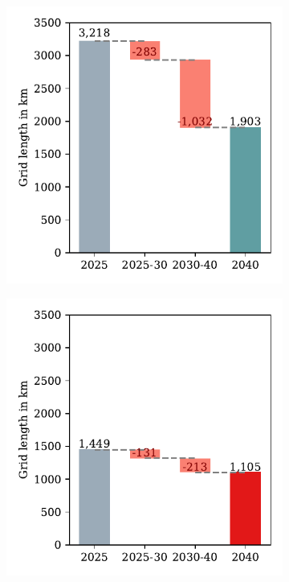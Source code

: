 \begin{figure}[h]
\begin{subfigure}[c]{0.5\textwidth}
		\includegraphics[width=1\linewidth]{figures/results/waterfall/waterfall_elec_mid.pdf}
		\vspace{-0.6cm}
		\label{Fig:b}
	\end{subfigure}
	\newline
	\newline
	\newline
	\begin{subfigure}[c]{0.5\textwidth}
		\centering
		\includegraphics[width=1\linewidth]{figures/results/waterfall/waterfall_gm_high.pdf}

\end{subfigure}
\end{figure}
